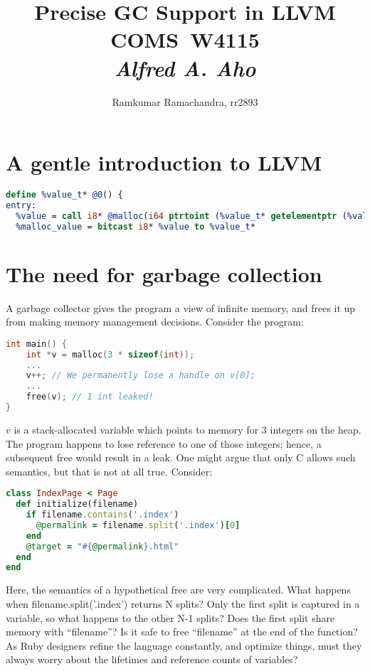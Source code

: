 \documentclass{article}
\title{
\vspace{2in}
\textmd{\textbf{Precise GC Support in LLVM}}\\
\vspace{0.1in}\large{COMS\ W4115}\\
\vspace{0.1in}\large{\textit{Alfred A. Aho}}
\vspace{2in}
}
\author{Ramkumar Ramachandra, rr2893}
\begin{document}
\maketitle
\newpage
\tableofcontents
\newpage
\section{A gentle introduction to LLVM}
\begin{lstlisting}[language=llvm]
define %value_t* @0() {
entry:
  %value = call i8* @malloc(i64 ptrtoint (%value_t* getelementptr (%value_t* null, i32 1) to i64))
  %malloc_value = bitcast i8* %value to %value_t*
\end{lstlisting}

\section{The need for garbage collection}
A garbage collector gives the program a view of infinite memory, and
frees it up from making memory management decisions. Consider the
program:
\begin{lstlisting}[language=c]
int main() {
	int *v = malloc(3 * sizeof(int));
	...
	v++; // We permanently lose a handle on v[0];
	...
	free(v); // 1 int leaked!
}
\end{lstlisting}
$v$ is a stack-allocated variable which points to memory for 3
integers on the heap. The program happens to lose reference to one of
those integers; hence, a subsequent free would result in a leak. One
might argue that only C allows such semantics, but that is not at all
true. Consider:
\begin{lstlisting}[language=ruby]
class IndexPage < Page
  def initialize(filename)
    if filename.contains('.index')
      @permalink = filename.split('.index')[0]
    end
    @target = "#{@permalink}.html"
  end
end
\end{lstlisting}
Here, the semantics of a hypothetical free are very complicated. What
happens when filename.split('.index') returns N splits? Only the first
split is captured in a variable, so what happens to the other N-1
splits? Does the first split share memory with ``filename''? Is it
safe to free ``filename'' at the end of the function? As Ruby
designers refine the language constantly, and optimize things, must
they always worry about the lifetimes and reference counts of
variables?
\end{document}
